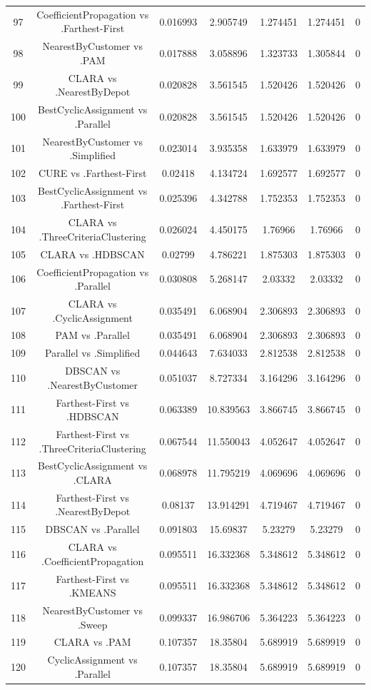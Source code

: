 \documentclass[a4paper,10pt]{article}
\begin{document}
\begin{landscape}
\begin{table}[!htp]
\begin{tabular}{ccccccc}
97&CoefficientPropagation vs .Farthest-First&0.016993&2.905749&1.274451&1.274451&0\\
98&NearestByCustomer vs .PAM&0.017888&3.058896&1.323733&1.305844&0\\
99&CLARA vs .NearestByDepot&0.020828&3.561545&1.520426&1.520426&0\\
100&BestCyclicAssignment vs .Parallel&0.020828&3.561545&1.520426&1.520426&0\\
101&NearestByCustomer vs .Simplified&0.023014&3.935358&1.633979&1.633979&0\\
102&CURE vs .Farthest-First&0.02418&4.134724&1.692577&1.692577&0\\
103&BestCyclicAssignment vs .Farthest-First&0.025396&4.342788&1.752353&1.752353&0\\
104&CLARA vs .ThreeCriteriaClustering&0.026024&4.450175&1.76966&1.76966&0\\
105&CLARA vs .HDBSCAN&0.02799&4.786221&1.875303&1.875303&0\\
106&CoefficientPropagation vs .Parallel&0.030808&5.268147&2.03332&2.03332&0\\
107&CLARA vs .CyclicAssignment&0.035491&6.068904&2.306893&2.306893&0\\
108&PAM vs .Parallel&0.035491&6.068904&2.306893&2.306893&0\\
109&Parallel vs .Simplified&0.044643&7.634033&2.812538&2.812538&0\\
110&DBSCAN vs .NearestByCustomer&0.051037&8.727334&3.164296&3.164296&0\\
111&Farthest-First vs .HDBSCAN&0.063389&10.839563&3.866745&3.866745&0\\
112&Farthest-First vs .ThreeCriteriaClustering&0.067544&11.550043&4.052647&4.052647&0\\
113&BestCyclicAssignment vs .CLARA&0.068978&11.795219&4.069696&4.069696&0\\
114&Farthest-First vs .NearestByDepot&0.08137&13.914291&4.719467&4.719467&0\\
115&DBSCAN vs .Parallel&0.091803&15.69837&5.23279&5.23279&0\\
116&CLARA vs .CoefficientPropagation&0.095511&16.332368&5.348612&5.348612&0\\
117&Farthest-First vs .KMEANS&0.095511&16.332368&5.348612&5.348612&0\\
118&NearestByCustomer vs .Sweep&0.099337&16.986706&5.364223&5.364223&0\\
119&CLARA vs .PAM&0.107357&18.35804&5.689919&5.689919&0\\
120&CyclicAssignment vs .Parallel&0.107357&18.35804&5.689919&5.689919&0\\

\end{tabular}
\end{table}
\end{landscape}
\end{document}
